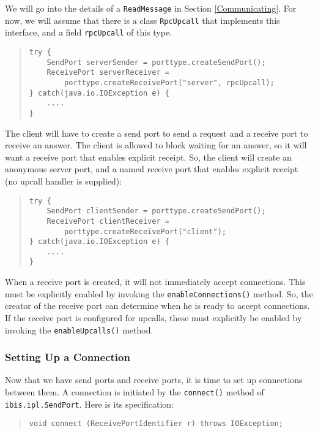 \documentclass[10pt]{article}
\begin{document}
We will go into the details of a \texttt{ReadMessage} in Section
\ref{Communicating}. For now, we will assume that there is a
class \texttt{RpcUpcall} that implements this interface, and
a field \texttt{rpcUpcall} of this type.

\begin{quote}
\begin{verbatim}
try {
    SendPort serverSender = porttype.createSendPort();
    ReceivePort serverReceiver =
        porttype.createReceivePort("server", rpcUpcall);
} catch(java.io.IOException e) {
    ....
}
\end{verbatim}
\end{quote}

\noindent
The client will have to create a send port
to send a request and a receive port to receive an answer.
The client is allowed to block waiting for an answer, so it will
want a receive port that enables explicit receipt.
So, the client will create an anonymous server port, and a named
receive port that enables explicit receipt (no upcall handler is supplied):
\begin{quote}
\begin{verbatim}
try {
    SendPort clientSender = porttype.createSendPort();
    ReceivePort clientReceiver =
        porttype.createReceivePort("client");
} catch(java.io.IOException e) {
    ....
}
\end{verbatim}
\end{quote}

\noindent
When a receive port is created, it will not immediately accept connections.
This must be explicitly enabled by
invoking the \texttt{enableConnections()} method. So, the creator of
the receive port can determine when he is ready to accept connections.
If the receive port is configured for upcalls, these must
explicitly be enabled by invoking the \texttt{enableUpcalls()} method.

\subsubsection{Setting Up a Connection}

Now that we have send ports and receive ports, it is time to set up
connections between them.
A connection is initiated by the \texttt{connect()} method of
\texttt{ibis.ipl.SendPort}.
Here is its specification:

\begin{quote}
\begin{verbatim}
void connect (ReceivePortIdentifier r) throws IOException;
\end{verbatim}
\end{quote}
\end{document}
